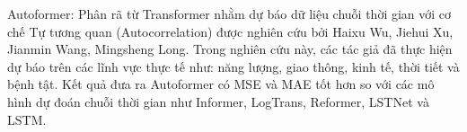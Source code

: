 Autoformer: Phân rã từ Transformer nhằm dự báo dữ liệu chuỗi thời gian với cơ chế Tự tương quan (Autocorrelation) được nghiên cứu bởi Haixu Wu, Jiehui Xu, Jianmin Wang, Mingsheng Long\cite{autoformer3}. Trong nghiên cứu này, các tác giả đã thực hiện dự báo trên các lĩnh vực thực tế như: năng lượng, giao thông, kinh tế, thời tiết và bệnh tật. Kết quả đưa ra Autoformer có MSE và MAE tốt hơn so với các mô hình dự đoán chuỗi thời gian như Informer, LogTrans, Reformer, LSTNet và LSTM.